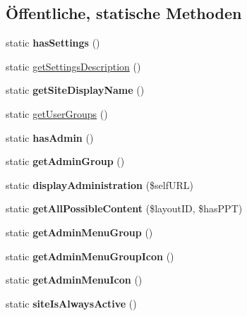 \subsection*{Öffentliche, statische Methoden}
\begin{DoxyCompactItemize}
\item 
\mbox{\label{classdigital_signage_a93457ae869a75e8be1a54b96bcfe386a}} 
static {\bfseries has\+Settings} ()
\item 
static \mbox{\hyperlink{classdigital_signage_a91f959778d7f6313642bcc1511c58dde}{get\+Settings\+Description}} ()
\item 
\mbox{\label{classdigital_signage_a1878a1340fc05b20e3dbe41d6647cab0}} 
static {\bfseries get\+Site\+Display\+Name} ()
\item 
static \mbox{\hyperlink{classdigital_signage_a10f0fc6518175da2e3259b1a8db0c831}{get\+User\+Groups}} ()
\item 
\mbox{\label{classdigital_signage_a9ede138b86494ddb85c789921e1c1b62}} 
static {\bfseries has\+Admin} ()
\item 
\mbox{\label{classdigital_signage_a83eecca88b7d2e6accb0936b714da7bd}} 
static {\bfseries get\+Admin\+Group} ()
\item 
\mbox{\label{classdigital_signage_abd0817926d611e39c24028f0c30bed0c}} 
static {\bfseries display\+Administration} (\$self\+U\+RL)
\item 
\mbox{\label{classdigital_signage_aee2f4b4b04dbc3f1c94b50a07fef401e}} 
static {\bfseries get\+All\+Possible\+Content} (\$layout\+ID, \$has\+P\+PT)
\item 
\mbox{\label{classdigital_signage_a36d7e2e572a0237730e52ec46f0cd6bd}} 
static {\bfseries get\+Admin\+Menu\+Group} ()
\item 
\mbox{\label{classdigital_signage_a85d7e5f87f52aac0dc3f2be84b92d57b}} 
static {\bfseries get\+Admin\+Menu\+Group\+Icon} ()
\item 
\mbox{\label{classdigital_signage_ad0e7511e2402069302e6fa4c596ebaab}} 
static {\bfseries get\+Admin\+Menu\+Icon} ()
\item 
\mbox{\label{classdigital_signage_a009e2b8bf7ddbeaaf6b2878ee29d260f}} 
static {\bfseries site\+Is\+Always\+Active} ()
\end{DoxyCompactItemize}
